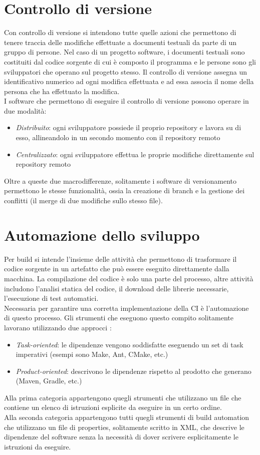 \documentclass[a4paper, 12pt]{report}
\numberwithin{equation}{section}
\begin{document}
\section{Controllo di versione}
Con controllo di versione si intendono tutte quelle azioni che permettono di tenere traccia delle modifiche effettuate a documenti testuali da parte di un gruppo di persone. Nel caso di un progetto software, i documenti testuali sono costituiti dal codice sorgente di cui è composto il programma e le persone sono gli sviluppatori che operano sul progetto stesso.
Il controllo di versione assegna un identificativo numerico ad ogni modifica effettuata e ad essa associa il nome della persona che ha effettuato la modifica.\\
I software che permettono di eseguire il controllo di versione possono operare in due modalità:
\begin{itemize}
    \item \emph{Distribuito}: ogni sviluppatore possiede il proprio repository e lavora su di esso, allineandolo in un secondo momento con il repository remoto
    \item \emph{Centralizzato}: ogni sviluppatore effettua le proprie modifiche direttamente sul repository remoto
\end{itemize}
Oltre a queste due macrodifferenze, solitamente i software di versionamento permettono le stesse funzionalità, ossia la creazione di branch e la gestione dei conflitti (il merge di due modifiche sullo stesso file).

\section{Automazione dello sviluppo}
Per build si intende l’insieme delle attività che permettono di trasformare il codice sorgente in un artefatto che può essere eseguito direttamente dalla macchina. La compilazione del codice è solo una parte del processo, altre attività includono l’analisi statica del codice, il download delle librerie necessarie, l’esecuzione di test automatici.\\
Necessaria per garantire una corretta implementazione della CI è l’automazione di questo processo. Gli strumenti che eseguono questo compito solitamente lavorano utilizzando due approcci \cite{clark-automation}:
\begin{itemize}
    \item \emph{Task-oriented}: le dipendenze vengono soddisfatte eseguendo un set di task imperativi (esempi sono Make, Ant, CMake, etc.)
    \item \emph{Product-oriented}: descrivono le dipendenze rispetto al prodotto che generano (Maven, Gradle, etc.)
\end{itemize}
Alla prima categoria appartengono quegli strumenti che utilizzano un file che contiene un elenco di istruzioni esplicite da eseguire in un certo ordine.\\
Alla seconda categoria appartengono tutti quegli strumenti di build automation che utilizzano un file di properties, solitamente scritto in XML, che descrive le dipendenze del software senza la necessità di dover scrivere esplicitamente le istruzioni da eseguire.
\end{document}
